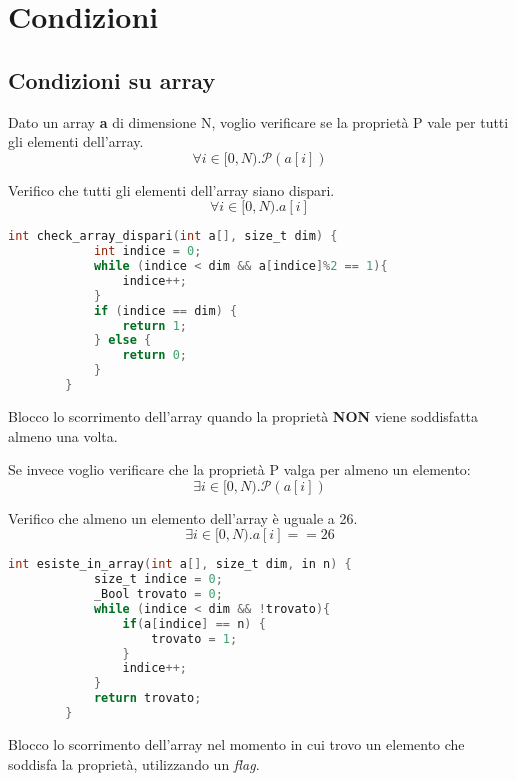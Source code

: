 \newpage
\section{Condizioni}
\subsection{Condizioni su array}
Dato un array \textbf{a} di dimensione N, voglio verificare se la proprietà P vale per tutti gli elementi dell'array.
\begin{equation}
	\forall i \in [0, N).\mathcal{P}(a[i])
\end{equation}
\begin{example}
	Verifico che tutti gli elementi dell'array siano dispari.
	\begin{equation}
		\forall i \in [0, N).a[i]%
	\end{equation}
	\begin{lstlisting}[language=C, caption=Verifica di proprietà su tutti gli elementi mathescape=true]
		int check_array_dispari(int a[], size_t dim) {
			int indice = 0;
			while (indice < dim && a[indice]%2 == 1){
				indice++;
			}
			if (indice == dim) {
				return 1;
			} else {
				return 0;
			}	
		}
	\end{lstlisting}
	Blocco lo scorrimento dell'array quando la proprietà \textbf{NON} viene soddisfatta almeno una volta.
\end{example}

\noindent
Se invece voglio verificare che la proprietà P valga per almeno un elemento:
\begin{equation}
	\exists i \in [0, N).\mathcal{P}(a[i])
\end{equation}
\begin{example}
	Verifico che almeno un elemento dell'array è uguale a 26.
	\begin{equation}
		\exists i \in [0, N).a[i]==26
	\end{equation}
	\begin{lstlisting}[language=C, caption=Verifica di proprietà su almeno un elemento, mathescape=true]
		int esiste_in_array(int a[], size_t dim, in n) {
			size_t indice = 0;
			_Bool trovato = 0;
			while (indice < dim && !trovato){
				if(a[indice] == n) {
					trovato = 1;	
				}
				indice++;
			}
			return trovato;
		}
	\end{lstlisting}
	Blocco lo scorrimento dell'array nel momento in cui trovo un elemento che soddisfa la proprietà, utilizzando un \textit{flag}.
\end{example}
